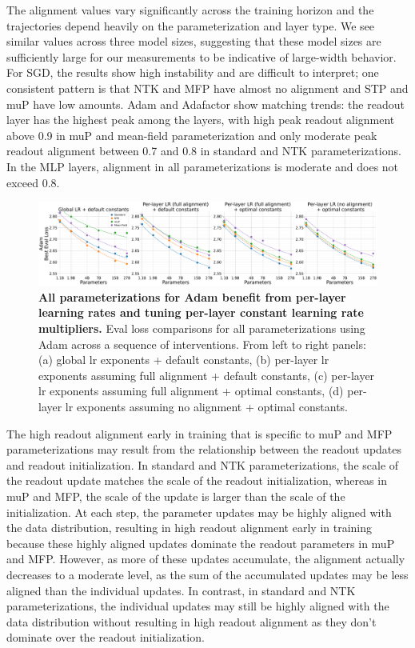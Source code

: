 \documentclass{article}
\theoremstyle{plain}
\theoremstyle{definition}
\theoremstyle{remark}
\begin{document}
The alignment values vary significantly across the training horizon and the trajectories depend heavily on the parameterization and layer type. We see similar values across three model sizes, suggesting that these model sizes are sufficiently large for our measurements to be indicative of large-width behavior. For SGD, the results show high instability and are difficult to interpret; one consistent pattern is that NTK and MFP have almost no alignment and STP and muP have low amounts. Adam and Adafactor show matching trends: the readout layer has the highest peak among the layers, with high peak readout alignment above 0.9 in muP and mean-field parameterization and only moderate peak readout alignment between 0.7 and 0.8 in standard and NTK parameterizations. In the MLP layers, alignment in all parameterizations is moderate and does not exceed 0.8.

\begin{figure}[ht]
    \centering
    \includegraphics[width=\textwidth]{icml2024/figures/per_layer_lr/adamw_additive_interventions.pdf}
    \caption{\textbf{All parameterizations for Adam benefit from per-layer learning rates and tuning per-layer constant learning rate multipliers.} Eval loss comparisons for all parameterizations using Adam across a sequence of interventions. From left to right panels: (a) global lr exponents + default constants, (b) per-layer lr exponents assuming full alignment + default constants, (c) per-layer lr exponents assuming full alignment + optimal constants, (d) per-layer lr exponents assuming no alignment + optimal constants.}
    \label{fig:adam_additive_interventions}
\end{figure}

The high readout alignment early in training that is specific to muP and MFP parameterizations may result from the relationship between the readout updates and readout initialization. In standard and NTK parameterizations, the scale of the readout update matches the scale of the readout initialization, whereas in muP and MFP, the scale of the update is larger than the scale of the initialization. At each step, the parameter updates may be highly aligned with the data distribution, resulting in high readout alignment early in training because these highly aligned updates dominate the readout parameters in muP and MFP. However, as more of these updates accumulate, the alignment actually decreases to a moderate level, as the sum of the accumulated updates may be less aligned than the individual updates. In contrast, in standard and NTK parameterizations, the individual updates may still be highly aligned with the data distribution without resulting in high readout alignment as they don't dominate over the readout initialization.
\end{document}
